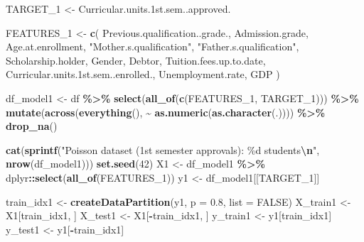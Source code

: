 \documentclass[
]{article}
\newenvironment{Shaded}{\begin{snugshade}}{\end{snugshade}}
\newcommand{\AttributeTok}[1]{\textcolor[rgb]{0.13,0.29,0.53}{#1}}
\newcommand{\ConstantTok}[1]{\textcolor[rgb]{0.56,0.35,0.01}{#1}}
\newcommand{\DecValTok}[1]{\textcolor[rgb]{0.00,0.00,0.81}{#1}}
\newcommand{\FloatTok}[1]{\textcolor[rgb]{0.00,0.00,0.81}{#1}}
\newcommand{\FunctionTok}[1]{\textcolor[rgb]{0.13,0.29,0.53}{\textbf{#1}}}
\newcommand{\NormalTok}[1]{#1}
\newcommand{\OtherTok}[1]{\textcolor[rgb]{0.56,0.35,0.01}{#1}}
\newcommand{\SpecialCharTok}[1]{\textcolor[rgb]{0.81,0.36,0.00}{\textbf{#1}}}
\newcommand{\StringTok}[1]{\textcolor[rgb]{0.31,0.60,0.02}{#1}}
\begin{document}
\begin{Shaded}
\begin{Highlighting}[]
\NormalTok{TARGET\_1 }\OtherTok{\textless{}{-}} \StringTok{\textquotesingle{}Curricular.units.1st.sem..approved.\textquotesingle{}}

\NormalTok{FEATURES\_1 }\OtherTok{\textless{}{-}} \FunctionTok{c}\NormalTok{(}
    \StringTok{\textquotesingle{}Previous.qualification..grade.\textquotesingle{}}\NormalTok{,}
    \StringTok{\textquotesingle{}Admission.grade\textquotesingle{}}\NormalTok{,}
    \StringTok{\textquotesingle{}Age.at.enrollment\textquotesingle{}}\NormalTok{,}
    \StringTok{"Mother.s.qualification"}\NormalTok{,}
    \StringTok{"Father.s.qualification"}\NormalTok{,}
    \StringTok{\textquotesingle{}Scholarship.holder\textquotesingle{}}\NormalTok{,}
    \StringTok{\textquotesingle{}Gender\textquotesingle{}}\NormalTok{,}
    \StringTok{\textquotesingle{}Debtor\textquotesingle{}}\NormalTok{,}
    \StringTok{\textquotesingle{}Tuition.fees.up.to.date\textquotesingle{}}\NormalTok{,}
    \StringTok{\textquotesingle{}Curricular.units.1st.sem..enrolled.\textquotesingle{}}\NormalTok{,}
    \StringTok{\textquotesingle{}Unemployment.rate\textquotesingle{}}\NormalTok{,}
    \StringTok{\textquotesingle{}GDP\textquotesingle{}}
\NormalTok{)}

\NormalTok{df\_model1 }\OtherTok{\textless{}{-}}\NormalTok{ df }\SpecialCharTok{\%\textgreater{}\%}
    \FunctionTok{select}\NormalTok{(}\FunctionTok{all\_of}\NormalTok{(}\FunctionTok{c}\NormalTok{(FEATURES\_1, TARGET\_1))) }\SpecialCharTok{\%\textgreater{}\%}
    \FunctionTok{mutate}\NormalTok{(}\FunctionTok{across}\NormalTok{(}\FunctionTok{everything}\NormalTok{(), }\SpecialCharTok{\textasciitilde{}} \FunctionTok{as.numeric}\NormalTok{(}\FunctionTok{as.character}\NormalTok{(.)))) }\SpecialCharTok{\%\textgreater{}\%}
    \FunctionTok{drop\_na}\NormalTok{()}

\FunctionTok{cat}\NormalTok{(}\FunctionTok{sprintf}\NormalTok{(}\StringTok{"Poisson dataset (1st semester approvals): \%d students}\SpecialCharTok{\textbackslash{}n}\StringTok{"}\NormalTok{, }\FunctionTok{nrow}\NormalTok{(df\_model1)))}
\FunctionTok{set.seed}\NormalTok{(}\DecValTok{42}\NormalTok{)}
\NormalTok{X1 }\OtherTok{\textless{}{-}}\NormalTok{ df\_model1 }\SpecialCharTok{\%\textgreater{}\%}\NormalTok{ dplyr}\SpecialCharTok{::}\FunctionTok{select}\NormalTok{(}\FunctionTok{all\_of}\NormalTok{(FEATURES\_1))}
\NormalTok{y1 }\OtherTok{\textless{}{-}}\NormalTok{ df\_model1[[TARGET\_1]]}

\NormalTok{train\_idx1 }\OtherTok{\textless{}{-}} \FunctionTok{createDataPartition}\NormalTok{(y1, }\AttributeTok{p =} \FloatTok{0.8}\NormalTok{, }\AttributeTok{list =} \ConstantTok{FALSE}\NormalTok{)}
\NormalTok{X\_train1 }\OtherTok{\textless{}{-}}\NormalTok{ X1[train\_idx1, ]}
\NormalTok{X\_test1  }\OtherTok{\textless{}{-}}\NormalTok{ X1[}\SpecialCharTok{{-}}\NormalTok{train\_idx1, ]}
\NormalTok{y\_train1 }\OtherTok{\textless{}{-}}\NormalTok{ y1[train\_idx1]}
\NormalTok{y\_test1  }\OtherTok{\textless{}{-}}\NormalTok{ y1[}\SpecialCharTok{{-}}\NormalTok{train\_idx1]}


\end{Highlighting}
\end{Shaded}
\end{document}
